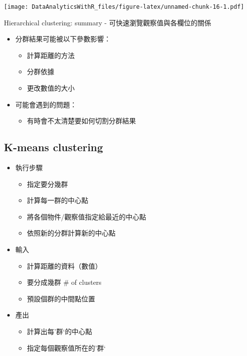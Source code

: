 \documentclass[]{book}
\providecommand{\tightlist}{%
  \setlength{\itemsep}{0pt}\setlength{\parskip}{0pt}}
\begin{document}
\texttt{[image: DataAnalyticsWithR\_files/figure-latex/unnamed-chunk-16-1.pdf]}

Hierarchical clustering: summary
- 可快速瀏覽觀察值與各欄位的關係

\begin{itemize}
\tightlist
\item
  分群結果可能被以下參數影響：

  \begin{itemize}
  \tightlist
  \item
    計算距離的方法
  \item
    分群依據
  \item
    更改數值的大小
  \end{itemize}
\item
  可能會遇到的問題：

  \begin{itemize}
  \tightlist
  \item
    有時會不太清楚要如何切割分群結果
  \end{itemize}
\end{itemize}

\hypertarget{k-means-clustering}{%
\subsection{K-means clustering}\label{k-means-clustering}}

\begin{itemize}
\tightlist
\item
  執行步驟

  \begin{itemize}
  \tightlist
  \item
    指定要分幾群
  \item
    計算每一群的中心點
  \item
    將各個物件/觀察值指定給最近的中心點
  \item
    依照新的分群計算新的中心點
  \end{itemize}
\item
  輸入

  \begin{itemize}
  \tightlist
  \item
    計算距離的資料（數值）
  \item
    要分成幾群 \# of clusters
  \item
    預設個群的中間點位置
  \end{itemize}
\item
  產出

  \begin{itemize}
  \tightlist
  \item
    計算出每'群`的中心點
  \item
    指定每個觀察值所在的'群`
  \end{itemize}
\end{itemize}
\end{document}

